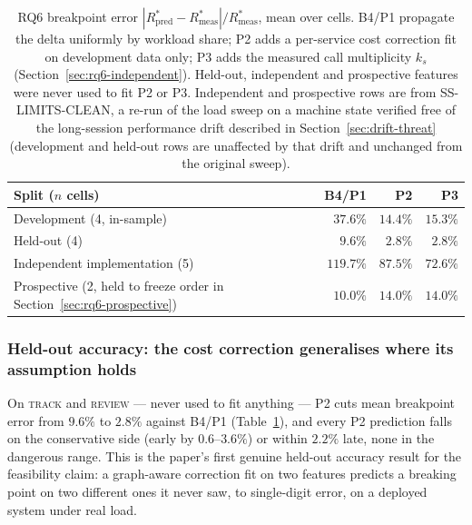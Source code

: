 \documentclass[journal, 10pt]{IEEEtran}
\begin{document}
\begin{table}[!t]
\centering
\caption{RQ6 breakpoint error $|R^{*}_{\text{pred}}-R^{*}_{\text{meas}}|/R^{*}_{\text{meas}}$,
mean over cells. B4/P1 propagate the delta uniformly by workload share; P2 adds
a per-service cost correction fit on development data only; P3 adds the
measured call multiplicity $k_s$ (Section~\ref{sec:rq6-independent}). Held-out,
independent and prospective features were never used to fit P2 or P3. Independent
and prospective rows are from \textsc{SS-LIMITS-CLEAN}, a re-run of the load
sweep on a machine state verified free of the long-session performance drift
described in Section~\ref{sec:drift-threat} (development and held-out rows are
unaffected by that drift and unchanged from the original sweep).}
\label{tab:rq6-error}
\begin{tabular}{lrrr}
\toprule
Split ($n$ cells) & B4/P1 & P2 & P3 \\
\midrule
Development (4, in-sample)   & $37.6\%$  & $14.4\%$  & $15.3\%$ \\
Held-out (4)                 & $9.6\%$   & $\mathbf{2.8\%}$  & $2.8\%$ \\
Independent implementation (5) & $119.7\%$ & $87.5\%$ & $\mathbf{72.6\%}$ \\
Prospective (2, held to freeze order in Section~\ref{sec:rq6-prospective}) & $10.0\%$ & $14.0\%$ & $14.0\%$ \\
\bottomrule
\end{tabular}
\end{table}

\subsubsection{Held-out accuracy: the cost correction generalises where its assumption holds}
\label{sec:rq6-heldout}
On \textsc{track} and \textsc{review} --- never used to fit anything --- P2
cuts mean breakpoint error from $9.6\%$ to $2.8\%$ against B4/P1
(Table~\ref{tab:rq6-error}), and every P2 prediction falls on the conservative
side (early by $0.6$--$3.6\%$) or within $2.2\%$ late, none in the dangerous
range. This is the paper's first genuine held-out accuracy result for the
feasibility claim: a graph-aware correction fit on two features predicts a
breaking point on two different ones it never saw, to single-digit error, on
a deployed system under real load.
\end{document}
